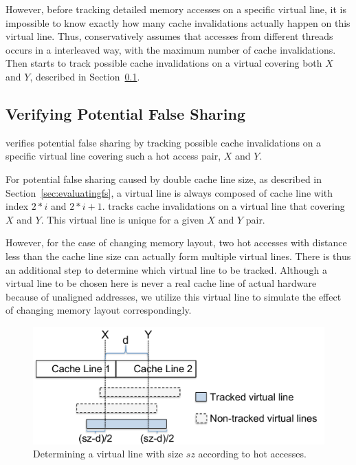 However, before tracking detailed memory accesses on a specific virtual line, it is impossible to know exactly how many cache invalidations actually happen on this virtual line. Thus, \Predator{} conservatively assumes that accesses from different threads occurs in a interleaved way, with the maximum number of cache invalidations. Then \Predator{} starts to track possible cache invalidations on a virtual covering both $X$ and $Y$, described in Section~\ref{sec:tracking}.  

  

\subsection{Verifying Potential False Sharing}
\label{sec:tracking}

\Predator{} verifies potential false sharing by tracking possible cache invalidations on a specific virtual line covering such a hot access pair, $X$ and $Y$.

For potential false sharing caused by double cache line size, as described in Section~\ref{sec:evaluatingfs}, a virtual line is always composed of cache line with index $2*i$ and $2*i+1$. 
\Predator{} tracks cache invalidations on a virtual line that covering $X$ and $Y$. This virtual line is unique for a given $X$ and $Y$ pair. 

However, for the case of changing memory layout, two hot accesses with distance less than the cache line size 
can actually form multiple virtual lines. 
There is thus an additional step to determine which virtual line to be tracked. 
Although a virtual line to be chosen here is never a real cache line of actual hardware because of unaligned addresses,
we utilize this virtual line to simulate the effect of changing memory layout correspondingly.


\begin{figure}
\begin{center} 
\includegraphics[width=6in]{predator/figure/trackpotential}
\end{center}
\caption{Determining a virtual line with size $sz$ according to hot accesses.}
\label{fig:trackpotential}
\end{figure}

